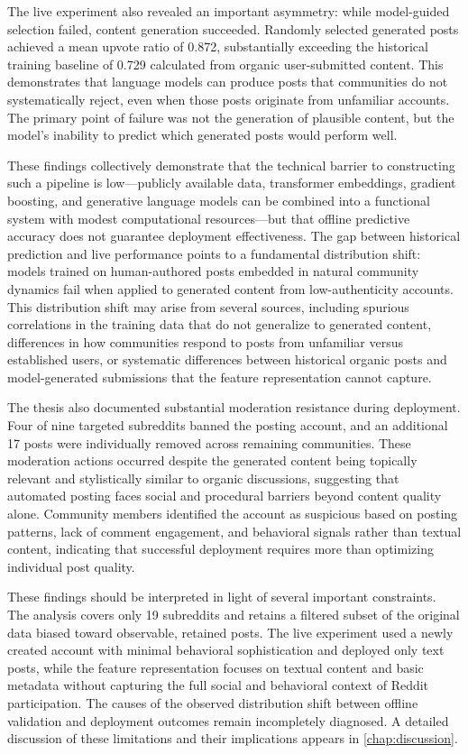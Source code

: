 The live experiment also revealed an important asymmetry: while model-guided selection failed, content generation succeeded. Randomly selected generated posts achieved a mean upvote ratio of 0.872, substantially exceeding the historical training baseline of 0.729 calculated from organic user-submitted content. This demonstrates that language models can produce posts that communities do not systematically reject, even when those posts originate from unfamiliar accounts. The primary point of failure was not the generation of plausible content, but the model's inability to predict which generated posts would perform well.

These findings collectively demonstrate that the technical barrier to constructing such a pipeline is low—publicly available data, transformer embeddings, gradient boosting, and generative language models can be combined into a functional system with modest computational resources—but that offline predictive accuracy does not guarantee deployment effectiveness. The gap between historical prediction and live performance points to a fundamental distribution shift: models trained on human-authored posts embedded in natural community dynamics fail when applied to generated content from low-authenticity accounts. This distribution shift may arise from several sources, including spurious correlations in the training data that do not generalize to generated content, differences in how communities respond to posts from unfamiliar versus established users, or systematic differences between historical organic posts and model-generated submissions that the feature representation cannot capture.

The thesis also documented substantial moderation resistance during deployment. Four of nine targeted subreddits banned the posting account, and an additional 17 posts were individually removed across remaining communities. These moderation actions occurred despite the generated content being topically relevant and stylistically similar to organic discussions, suggesting that automated posting faces social and procedural barriers beyond content quality alone. Community members identified the account as suspicious based on posting patterns, lack of comment engagement, and behavioral signals rather than textual content, indicating that successful deployment requires more than optimizing individual post quality.

These findings should be interpreted in light of several important constraints. The analysis covers only 19 subreddits and retains a filtered subset of the original data biased toward observable, retained posts. The live experiment used a newly created account with minimal behavioral sophistication and deployed only text posts, while the feature representation focuses on textual content and basic metadata without capturing the full social and behavioral context of Reddit participation. The causes of the observed distribution shift between offline validation and deployment outcomes remain incompletely diagnosed. A detailed discussion of these limitations and their implications appears in \autoref{chap:discussion}.


